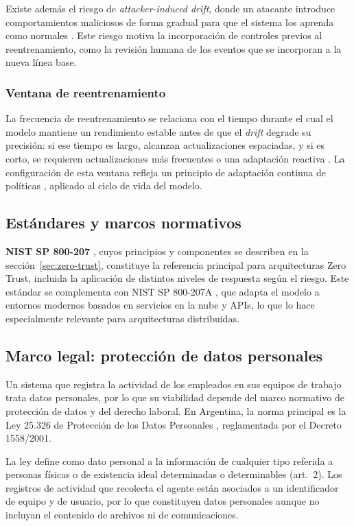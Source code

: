 Existe además el riesgo de \emph{attacker-induced drift}, donde un atacante introduce comportamientos maliciosos de forma gradual para que el sistema los aprenda como normales \parencite{Kuppa2022}. Este riesgo motiva la incorporación de controles previos al reentrenamiento, como la revisión humana de los eventos que se incorporan a la nueva línea base.

\subsubsection{Ventana de reentrenamiento}
La frecuencia de reentrenamiento se relaciona con el tiempo durante el cual el modelo mantiene un rendimiento estable antes de que el \emph{drift} degrade su precisión: si ese tiempo es largo, alcanzan actualizaciones espaciadas, y si es corto, se requieren actualizaciones más frecuentes o una adaptación reactiva \parencite{Gama2014}. La configuración de esta ventana refleja un principio de adaptación continua de políticas \parencite{Rose2020}, aplicado al ciclo de vida del modelo.

\subsection{Estándares y marcos normativos}
\textbf{NIST SP 800-207} \parencite{Rose2020}, cuyos principios y componentes se describen en la sección~\ref{sec:zero-trust}, constituye la referencia principal para arquitecturas Zero Trust, incluida la aplicación de distintos niveles de respuesta según el riesgo. Este estándar se complementa con NIST SP 800-207A \parencite{NIST2023_800207A}, que adapta el modelo a entornos modernos basados en servicios en la nube y APIs, lo que lo hace especialmente relevante para arquitecturas distribuidas.

\subsection{Marco legal: protección de datos personales}\label{sec:marco-legal}
Un sistema que registra la actividad de los empleados en sus equipos de trabajo trata datos
personales, por lo que su viabilidad depende del marco normativo de protección de datos y del
derecho laboral. En Argentina, la norma principal es la Ley 25.326 de Protección de los Datos
Personales \parencite{Ley25326}, reglamentada por el Decreto 1558/2001.

La ley define como dato personal a la información de cualquier tipo referida a personas físicas
o de existencia ideal determinadas o determinables (art.~2). Los registros de actividad que
recolecta el agente están asociados a un identificador de equipo y de usuario, por lo que
constituyen datos personales aunque no incluyan el contenido de archivos ni de comunicaciones.

